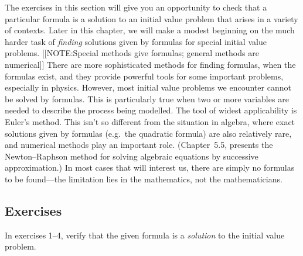 	The exercises in this section will give you an opportunity to check that a particular formula is a solution to an initial value problem that arises in a variety of contexts.  Later in this chapter, we will make a modest beginning on the much harder task of {\em finding\/} solutions given by formulas for special initial value problems.  
	[[NOTE:Special methods give formulas; general methods are numerical]]
There are more sophisticated methods for finding formulas, when the formulas exist, and they provide powerful tools for some important problems, especially in physics.  However, most initial value problems we encounter cannot be solved by formulas.  This is particularly true when two or 
more variables are needed to describe the process being modelled.  The tool of widest applicability is Euler's method.  This isn't so different from the situation in algebra, where exact solutions given by formulas (e.g.\ the quadratic formula) are also relatively rare, and numerical methods play an important role.  (Chapter~5.5, presents the Newton--Raphson method for solving algebraic equations by successive approximation.)  In most cases that will interest us, there are simply no formulas to be found---the limitation lies in the mathematics, not the mathematicians.  
\label{DEs w/ params-end}

\subsection{Exercises}
\label{subsec:exercises}


In exercises 1--4, verify that the given formula is a {\em solution\/} to the initial value problem.


